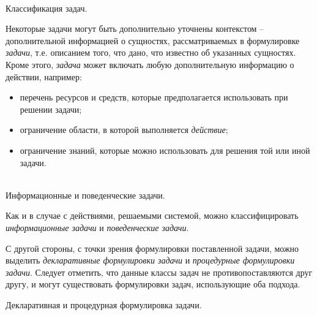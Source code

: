 \begin{frame}{\\Классификация задач.}
    \topline
	\justifying
 
    Некоторые задачи могут быть дополнительно уточнены контекстом -- дополнительной информацией о сущностях, рассматриваемых в формулировке \textit{задачи}, т.е. описанием того, что дано, что известно об указанных сущностях.\\
    Кроме этого, \textit{задача} может включать любую дополнительную информацию о действии, например:
    \begin{itemize}
        \item перечень ресурсов и средств, которые предполагается использовать при решении задачи;
        \item ограничение области, в которой выполняется \textit{действие};
        \item ограничение знаний, которые можно использовать для решения той или иной задачи.
    \end{itemize}
\end{frame}

\begin{frame}{\\Информационные и поведенческие задачи.}
	\topline
	\justifying

    Как и в случае с действиями, решаемыми системой, можно классифицировать \textit{информационные задачи} и \textit{поведенческие задачи}. 

    С другой стороны, с точки зрения формулировки поставленной задачи, можно выделить \textit{декларативные формулировки задачи} и \textit{процедурные формулировки задачи}. Следует отметить, что данные классы задач не противопоставляются друг другу, и могут существовать формулировки задач, использующие оба подхода.
\end{frame}

\begin{frame}{Декларативная и процедурная формулировка задачи.}
	\topline
	\justifying
     
    \begin{SCn}
    \end{SCn}
\end{frame}

